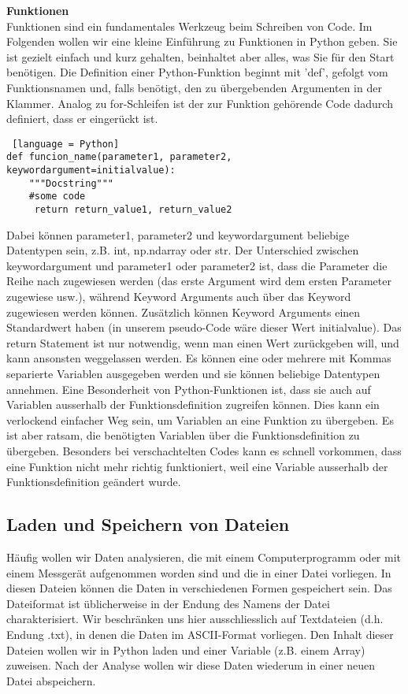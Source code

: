 \textbf{Funktionen} \\
Funktionen sind ein fundamentales Werkzeug beim Schreiben von Code. Im Folgenden wollen wir eine kleine Einführung zu Funktionen in Python geben. Sie ist gezielt einfach und kurz gehalten, beinhaltet aber alles, was Sie für den Start benötigen.  Die Definition einer Python-Funktion beginnt mit 'def', gefolgt vom Funktionsnamen und, falls benötigt, den zu übergebenden Argumenten in der Klammer. Analog zu for-Schleifen ist der zur Funktion gehörende Code dadurch definiert, dass er eingerückt ist. 
\begin{lstlisting} [language = Python]
def funcion_name(parameter1, parameter2, keywordargument=initialvalue):
    """Docstring"""
    #some code
     return return_value1, return_value2
\end{lstlisting}
 Dabei können parameter1, parameter2 und keywordargument beliebige Datentypen sein, z.B. int, np.ndarray oder str. Der Unterschied zwischen keywordargument und parameter1 oder parameter2 ist, dass die Parameter die Reihe nach zugewiesen werden (das erste Argument wird dem ersten Parameter zugewiese usw.), während Keyword Arguments auch über das Keyword zugewiesen werden können. Zusätzlich können Keyword Arguments einen Standardwert haben (in unserem pseudo-Code wäre dieser Wert initialvalue). Das return Statement ist nur notwendig, wenn man einen Wert zurückgeben will, und kann ansonsten weggelassen werden. Es können eine oder mehrere mit Kommas separierte Variablen ausgegeben werden und sie können beliebige Datentypen annehmen. Eine Besonderheit von Python-Funktionen ist, dass sie auch auf Variablen ausserhalb der Funktionsdefinition zugreifen können. Dies kann ein verlockend einfacher Weg sein, um Variablen an eine Funktion zu übergeben.  Es ist aber ratsam, die benötigten Variablen über die Funktionsdefinition zu übergeben. Besonders bei verschachtelten Codes kann es schnell vorkommen, dass eine Funktion nicht mehr richtig funktioniert, weil eine Variable ausserhalb der Funktionsdefinition geändert wurde.



\subsection{Laden und Speichern von Dateien} 

Häufig wollen wir Daten analysieren, die mit einem Computerprogramm oder mit einem Messgerät aufgenommen worden sind und die in einer Datei vorliegen. In diesen Dateien können die Daten in verschiedenen Formen gespeichert sein. Das Dateiformat  ist üblicherweise in der Endung des Namens der Datei charakterisiert.  Wir beschränken uns hier ausschliesslich auf Textdateien (d.h. Endung .txt), in denen die Daten im ASCII-Format vorliegen. Den Inhalt dieser Dateien wollen wir in Python laden und einer Variable (z.B. einem Array) zuweisen. Nach der Analyse wollen wir diese Daten wiederum in einer neuen Datei abspeichern. \\

